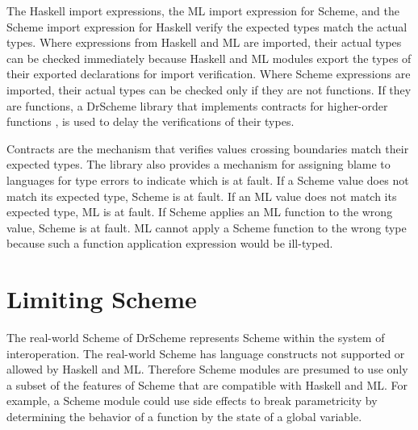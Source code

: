 The Haskell import expressions, the ML import expression for Scheme, and the Scheme import expression for Haskell verify the expected types match the actual types.  Where expressions from Haskell and ML are imported, their actual types can be checked immediately because Haskell and ML modules export the types of their exported declarations for import verification.  Where Scheme expressions are imported, their actual types can be checked only if they are not functions.  If they are functions, a DrScheme library that implements contracts for higher-order functions \cite{findler02}, is used to delay the verifications of their types.

Contracts are the mechanism that verifies values crossing boundaries match their expected types.  The library also provides a mechanism for assigning blame to languages for type errors to indicate which is at fault.  If a Scheme value does not match its expected type, Scheme is at fault.  If an ML value does not match its expected type, ML is at fault.  If Scheme applies an ML function to the wrong value, Scheme is at fault.  ML cannot apply a Scheme function to the wrong type because such a function application expression would be ill-typed.

\section{Limiting Scheme}

The real-world Scheme of DrScheme represents Scheme within the system of interoperation.  The real-world Scheme has language constructs not supported or allowed by Haskell and ML.  Therefore Scheme modules are presumed to use only a subset of the features of Scheme that are compatible with Haskell and ML.  For example, a Scheme module could use side effects to break parametricity by determining the behavior of a function by the state of a global variable.